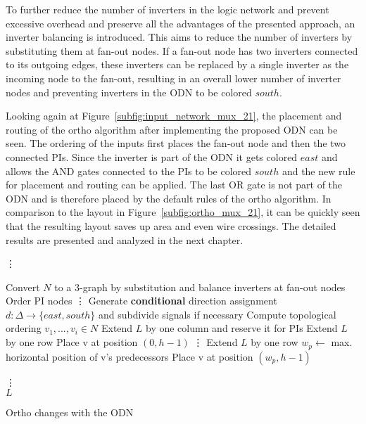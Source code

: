 To further reduce the number of inverters in the logic network and prevent excessive overhead and preserve all the advantages of the presented approach, an inverter balancing is introduced. This aims to reduce the number of inverters by substituting them at fan-out nodes. If a fan-out node has two inverters connected to its outgoing edges, these inverters can be replaced by a single inverter as the incoming node to the fan-out, resulting in an overall lower number of inverter nodes and preventing inverters in the ODN to be colored $south$.

Looking again at Figure~\ref{subfig:input_network_mux_21}, the placement and routing of the ortho algorithm after implementing the proposed ODN can be seen. The ordering of the inputs first places the fan-out node and then the two connected PIs. Since the inverter is part of the ODN it gets colored $east$ and allows the AND gates connected to the PIs to be colored $south$ and the new rule for placement and routing can be applied. The last OR gate is not part of the ODN and is therefore placed by the default rules of the ortho algorithm. In comparison to the layout in Figure~\ref{subfig:ortho_mux_21}, it can be quickly seen that the resulting layout saves up area and even wire crossings. The detailed results are presented and analyzed in the next chapter.

\begin{algorithm}[H]
	\vdots
	
	\begin{algorithmic}
		\State Convert $N$ to a 3-graph by substitution and balance inverters at fan-out nodes
		\State Order PI nodes
		\State \vdots
		\State Generate \textbf{conditional} direction assignment $d : \Delta \rightarrow \{east, south\}$ and subdivide signals if necessary
		\State Compute topological ordering $v_1, . . . , v_i \in N$
		\State Extend $L$ by one column and reserve it for PIs
		\State Extend $L$ by one row
		\State Place v at position $(0, h - 1)$
		\State \vdots
		\State Extend $L$ by one row
		\EndIf
		\State $w_p \leftarrow$ max. horizontal position of v's predecessors
		\State Place v at position $(w _p, h - 1)$
		\EndIf
		
		\EndFor
		\State \vdots \\
		\Return $L$
	\end{algorithmic}
	\caption{Ortho changes with the ODN}\label{alg:input_network}
\end{algorithm}

